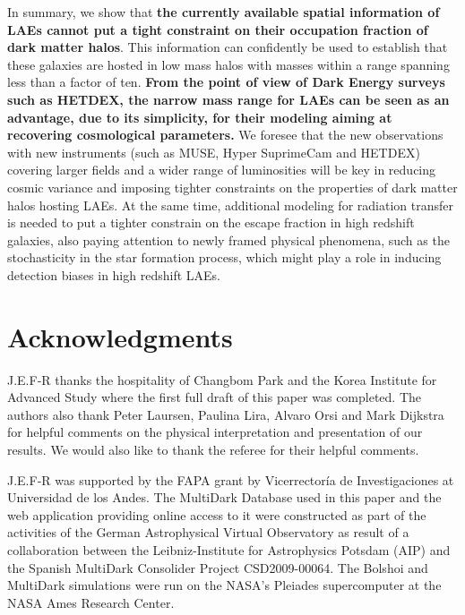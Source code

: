 \documentclass[usenatbib]{mn2e}
\newcommand{\ly}{{\ifmmode{{\rm Ly}\alpha}\else{Ly$\alpha$~}\fi}}
\begin{document}
In summary, we show that {\bf the currently available spatial
  information of LAEs cannot put a tight constraint on their
  occupation fraction of dark matter halos}. This information can
confidently be used to establish that these galaxies are hosted in low
mass halos with masses within a range spanning less than a factor of
ten. {\bf From the point of view of Dark Energy surveys such as
  HETDEX, the narrow mass range for LAEs can be seen as an advantage,
  due to its simplicity, for their modeling aiming at recovering
  cosmological parameters.} We foresee that the new observations with
new instruments (such as MUSE, Hyper SuprimeCam and HETDEX) covering
larger fields and a wider range of luminosities will be key in reducing cosmic variance and imposing tighter constraints on
the properties of dark matter halos hosting LAEs. At the same time,
additional modeling for \ly radiation transfer is needed to put a
tighter constrain on the \ly escape fraction in high redshift
galaxies, also paying attention to newly framed physical phenomena,
such as the stochasticity \citep{ForeroRomero2013} in the star
formation process, which might play a role in inducing detection
biases in high redshift LAEs. 


\section*{Acknowledgments} 
J.E.F-R thanks the hospitality of Changbom Park and the Korea
Institute for Advanced Study where the first full draft of this paper
was completed. The authors also thank Peter Laursen, Paulina Lira, 
Alvaro Orsi and Mark Dijkstra for helpful comments on the physical
interpretation and presentation of our results. We would
also like to thank the referee for their helpful comments.

J.E.F-R was
supported by the FAPA grant by Vicerrector\'ia de Investigaciones at
Universidad de los Andes. The MultiDark Database used in this paper and the web application providing online access to it were constructed as part of the
activities of the German Astrophysical Virtual Observatory as result
of a collaboration between the Leibniz-Institute for Astrophysics
Potsdam (AIP) and the Spanish MultiDark Consolider Project
CSD2009-00064. The Bolshoi and MultiDark simulations were run on the
NASA's Pleiades supercomputer at the NASA Ames Research Center.




 
\end{document}
